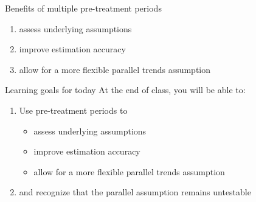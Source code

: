\documentclass{beamer}
\newcommand{\goalsframe}{\begin{frame}{Learning goals for today}
At the end of class, you will be able to:
\begin{enumerate}
\item Use pre-treatment periods to
\begin{itemize}
\item assess underlying assumptions
\item improve estimation accuracy
\item allow for a more flexible parallel trends assumption
\end{itemize}
\item and recognize that the parallel assumption remains untestable
\end{enumerate}
\end{frame}}
\begin{document}
\begin{frame}{Benefits of multiple pre-treatment periods}

\begin{enumerate}
\item assess underlying assumptions
\item improve estimation accuracy
\item allow for a more flexible parallel trends assumption
\end{enumerate}
\end{frame}

\goalsframe
\end{document}

